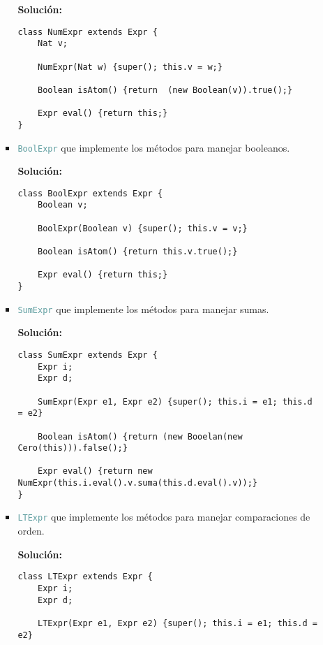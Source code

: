 \documentclass{article}
\newcommand{\tp}[1]{\textcolor{CadetBlue} {\texttt{#1}}}
\newcommand{\tb}[1]{\textcolor{RoyalPurple} {\textbf{#1}}}
\begin{document}
\begin{enumerate}
\begin{enumerate}
\begin{itemize}
                \tb{Solución:}

                \begin{verbatim}
class NumExpr extends Expr {
    Nat v;

    NumExpr(Nat w) {super(); this.v = w;}

    Boolean isAtom() {return  (new Boolean(v)).true();}

    Expr eval() {return this;}
}
                \end{verbatim}

                \item \tp{BoolExpr} que implemente los métodos para manejar
                booleanos.

                \tb{Solución:}

                \begin{verbatim}
class BoolExpr extends Expr {
    Boolean v;

    BoolExpr(Boolean v) {super(); this.v = v;}

    Boolean isAtom() {return this.v.true();}

    Expr eval() {return this;}
}
                \end{verbatim}

                \item \tp{SumExpr} que implemente los métodos para manejar
                sumas.

                \tb{Solución:}

                \begin{verbatim}
class SumExpr extends Expr {
    Expr i;
    Expr d;

    SumExpr(Expr e1, Expr e2) {super(); this.i = e1; this.d = e2}

    Boolean isAtom() {return (new Booelan(new Cero(this))).false();}

    Expr eval() {return new NumExpr(this.i.eval().v.suma(this.d.eval().v));}
}
                \end{verbatim}

                \item \tp{LTExpr} que implemente los métodos para manejar
                comparaciones de orden.

                \tb{Solución:}

                \begin{verbatim}
class LTExpr extends Expr {
    Expr i;
    Expr d;

    LTExpr(Expr e1, Expr e2) {super(); this.i = e1; this.d = e2}


\end{verbatim}
\end{itemize}
\end{enumerate}
\end{enumerate}
\end{document}
